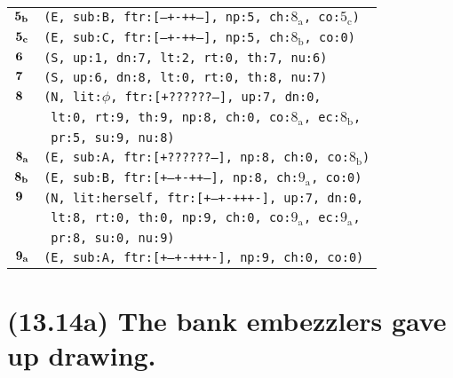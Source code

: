 \documentclass{article}
\begin{document}
\begin{minipage}{\textwidth}
{\begin{tabular}{|r|l|}
    ${\textbf{\textrm{5}}_{\textbf{\textrm{b}}}}$ & \texttt{\texttt{(E,~sub:B,~ftr:[---+-++--],~np:5,~ch:${\textrm{8}_{\textrm{a}}}$,~co:${\textrm{5}_{\textrm{c}}}$)}} \\
    ${\textbf{\textrm{5}}_{\textbf{\textrm{c}}}}$ & \texttt{\texttt{(E,~sub:C,~ftr:[---+-++--],~np:5,~ch:${\textrm{8}_{\textrm{b}}}$,~co:0)}} \\
    ${\textbf{\textrm{6}}_{\phantom{z}}}$ & \texttt{\texttt{(S,~up:1,~dn:7,~lt:2,~rt:0,~th:7,~nu:6)}} \\
    ${\textbf{\textrm{7}}_{\phantom{z}}}$ & \texttt{\texttt{(S,~up:6,~dn:8,~lt:0,~rt:0,~th:8,~nu:7)}} \\
    ${\textbf{\textrm{8}}_{\phantom{z}}}$ & \texttt{\texttt{(N,~lit:$\phi$,~ftr:[+??????--],~up:7,~dn:0,}} \\
    & \texttt{\texttt{~lt:0,~rt:9,~th:9,~np:8,~ch:0,~co:${\textrm{8}_{\textrm{a}}}$,~ec:${\textrm{8}_{\textrm{b}}}$,}} \\
    & \texttt{\texttt{~pr:5,~su:9,~nu:8)}} \\
    ${\textbf{\textrm{8}}_{\textbf{\textrm{a}}}}$ & \texttt{\texttt{(E,~sub:A,~ftr:[+??????--],~np:8,~ch:0,~co:${\textrm{8}_{\textrm{b}}}$)}} \\
    ${\textbf{\textrm{8}}_{\textbf{\textrm{b}}}}$ & \texttt{\texttt{(E,~sub:B,~ftr:[+--+-++--],~np:8,~ch:${\textrm{9}_{\textrm{a}}}$,~co:0)}} \\
    ${\textbf{\textrm{9}}_{\phantom{z}}}$ & \texttt{\texttt{(N,~lit:herself,~ftr:[+--+-+++-],~up:7,~dn:0,}} \\
    & \texttt{\texttt{~lt:8,~rt:0,~th:0,~np:9,~ch:0,~co:${\textrm{9}_{\textrm{a}}}$,~ec:${\textrm{9}_{\textrm{a}}}$,}} \\
    & \texttt{\texttt{~pr:8,~su:0,~nu:9)}} \\
    ${\textbf{\textrm{9}}_{\textbf{\textrm{a}}}}$ & \texttt{\texttt{(E,~sub:A,~ftr:[+--+-+++-],~np:9,~ch:0,~co:0)}} \\
    \hline
  \end{tabular}
  }
\end{minipage}
\bigbreak

\clearpage

%
%

\section*{(13.14a) The bank embezzlers gave up drawing.}
\end{document}
